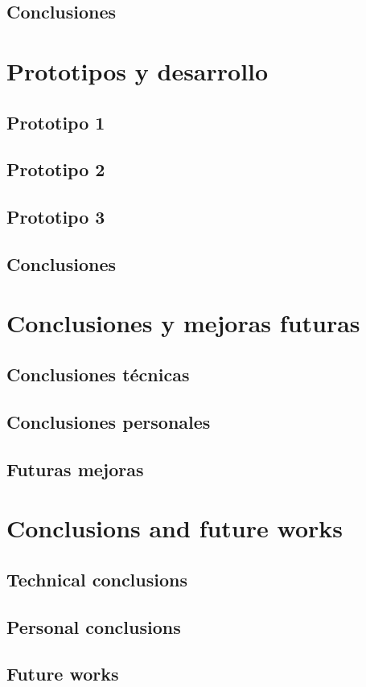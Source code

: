 \documentclass[twoside, openright, 11pt]{report}
\begin{document}
  \section{Conclusiones}

\chapter{Prototipos y desarrollo}\label{cap.prototipos y desarrollo}
  \section{Prototipo 1}
  \section{Prototipo 2}
  \section{Prototipo 3}
  \section{Conclusiones}

\chapter{Conclusiones y mejoras futuras}\label{cap.conclusiones y mejoras futuras}
  \section{Conclusiones técnicas}
  \section{Conclusiones personales}
  \section{Futuras mejoras}

\chapter{Conclusions and future works}\label{cap.conclusions and future works}
  \section{Technical conclusions}
  \section{Personal conclusions}
  \section{Future works}

\cleardoublepage
{}
\end{document}
